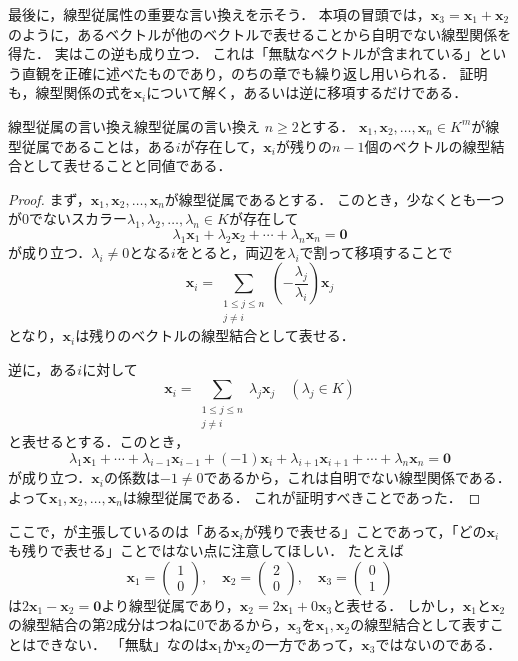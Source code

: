 最後に，線型従属性の重要な言い換えを示そう．
本項の冒頭では，$\bm{x}_3 = \bm{x}_1 + \bm{x}_2$のように，あるベクトルが他のベクトルで表せることから自明でない線型関係を得た．
実はこの逆も成り立つ．
これは「無駄なベクトルが含まれている」という直観を正確に述べたものであり，のちの章でも繰り返し用いられる．
証明も，線型関係の式を$\bm{x}_i$について解く，あるいは逆に移項するだけである．

\begin{prop}{線型従属の言い換え}{線型従属の言い換え}
  $n \ge 2$とする．
  $\bm{x}_1, \bm{x}_2, \dots, \bm{x}_n \in K^m$が線型従属であることは，ある$i$が存在して，$\bm{x}_i$が残りの$n - 1$個のベクトルの線型結合として表せることと同値である．
\end{prop}

\begin{tleftbar}
\begin{proof}
  まず，$\bm{x}_1, \bm{x}_2, \dots, \bm{x}_n$が線型従属であるとする．
  このとき，少なくとも一つが$0$でないスカラー$\lambda_1, \lambda_2, \dots, \lambda_n \in K$が存在して
  \[
    \lambda_1 \bm{x}_1 + \lambda_2 \bm{x}_2 + \cdots + \lambda_n \bm{x}_n = \bm{0}
  \]
  が成り立つ．$\lambda_i \ne 0$となる$i$をとると，両辺を$\lambda_i$で割って移項することで
  \[
    \bm{x}_i = \sum_{\substack{1 \le j \le n \\ j \ne i}} \left(-\frac{\lambda_j}{\lambda_i}\right) \bm{x}_j
  \]
  となり，$\bm{x}_i$は残りのベクトルの線型結合として表せる．

  逆に，ある$i$に対して
  \[
    \bm{x}_i = \sum_{\substack{1 \le j \le n \\ j \ne i}} \lambda_j \bm{x}_j
    \quad (\lambda_j \in K)
  \]
  と表せるとする．このとき，
  \[
    \lambda_1 \bm{x}_1 + \cdots + \lambda_{i-1} \bm{x}_{i-1} + (-1)\bm{x}_i + \lambda_{i+1} \bm{x}_{i+1} + \cdots + \lambda_n \bm{x}_n = \bm{0}
  \]
  が成り立つ．$\bm{x}_i$の係数は$-1 \ne 0$であるから，これは自明でない線型関係である．
  よって$\bm{x}_1, \bm{x}_2, \dots, \bm{x}_n$は線型従属である．
  これが証明すべきことであった．
\end{proof}
\end{tleftbar}

ここで，が主張しているのは「ある$\bm{x}_i$が残りで表せる」ことであって，「どの$\bm{x}_i$も残りで表せる」ことではない点に注意してほしい．
たとえば
\[
  \bm{x}_1 = \begin{pmatrix} 1 \\ 0 \end{pmatrix}, \quad
  \bm{x}_2 = \begin{pmatrix} 2 \\ 0 \end{pmatrix}, \quad
  \bm{x}_3 = \begin{pmatrix} 0 \\ 1 \end{pmatrix}
\]
は$2\bm{x}_1 - \bm{x}_2 = \bm{0}$より線型従属であり，$\bm{x}_2 = 2\bm{x}_1 + 0\bm{x}_3$と表せる．
しかし，$\bm{x}_1$と$\bm{x}_2$の線型結合の第$2$成分はつねに$0$であるから，$\bm{x}_3$を$\bm{x}_1,\bm{x}_2$の線型結合として表すことはできない．
「無駄」なのは$\bm{x}_1$か$\bm{x}_2$の一方であって，$\bm{x}_3$ではないのである．

